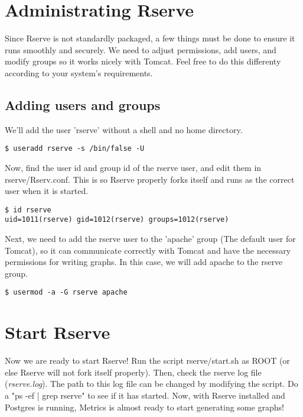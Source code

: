 \documentclass{article}
\begin{document}
\section{Administrating Rserve}
Since Rserve is not standardly packaged, a few things must be done to
ensure it runs smoothly and securely. We need to adjust permissions, add
users, and modify groups so it works nicely with Tomcat. Feel free to do
this differenty according to your system's requirements.

\subsection{Adding users and groups}
We'll add the user 'rserve' without a shell and no home directory.

\begin{verbatim}
$ useradd rserve -s /bin/false -U
\end{verbatim}

Now, find the user id and group id of the rserve user, and edit them in
rserve/Rserv.conf. This is so Rserve properly forks itself and runs as the
correct user when it is started.

\begin{verbatim}
$ id rserve
uid=1011(rserve) gid=1012(rserve) groups=1012(rserve)
\end{verbatim}

Next, we need to add the rserve user to the 'apache' group (The default
user for Tomcat), so it can communicate correctly with Tomcat and have the
necessary permissions for writing graphs. In this case, we will add apache
to the rserve group.

\begin{verbatim}
$ usermod -a -G rserve apache
\end{verbatim}

\section{Start Rserve}
Now we are ready to start Rserve! Run the script rserve/start.sh as ROOT
(or else Rserve will not fork itself properly). Then, check the rserve log
file (\emph{rserve.log}). The path to this log file can be changed by
modifying the script. Do a "ps -ef | grep rserve" to see if it has started.
Now, with Rserve installed and Postgres is running, Metrics is almost ready
to start generating some graphs!

\begin{center}
\end{center}
\end{document}
